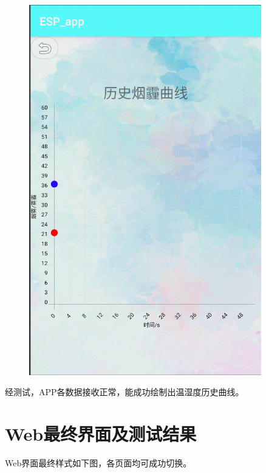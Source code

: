 \begin{figure}[h]
\begin{minipage}{0.3\textwidth}
        \includegraphics[width=0.9\textwidth]{figures/test/3}   
    \end{minipage}
\end{figure}

经测试，APP各数据接收正常，能成功绘制出温湿度历史曲线。

\section{Web最终界面及测试结果}

Web界面最终样式如下图，各页面均可成功切换。

